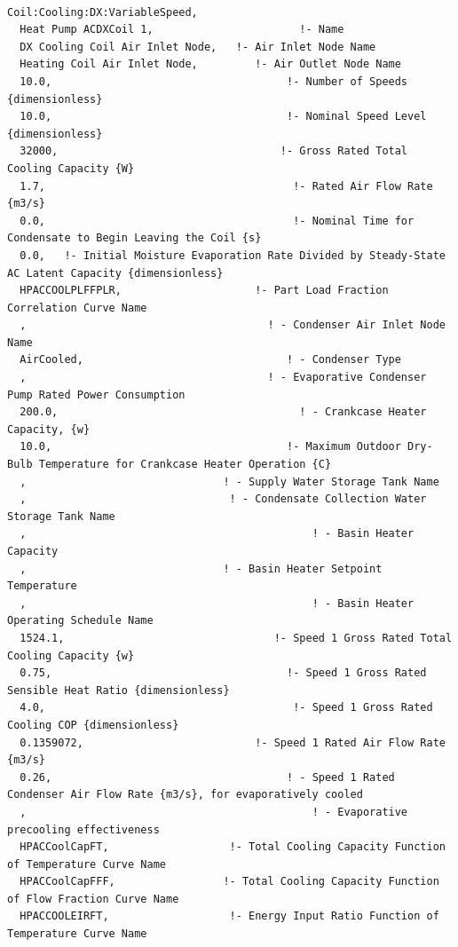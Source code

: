 \begin{lstlisting}

Coil:Cooling:DX:VariableSpeed,
  Heat Pump ACDXCoil 1,                       !- Name
  DX Cooling Coil Air Inlet Node,   !- Air Inlet Node Name
  Heating Coil Air Inlet Node,         !- Air Outlet Node Name
  10.0,                                     !- Number of Speeds {dimensionless}
  10.0,                                     !- Nominal Speed Level {dimensionless}
  32000,                                   !- Gross Rated Total Cooling Capacity {W}
  1.7,                                       !- Rated Air Flow Rate {m3/s}
  0.0,                                       !- Nominal Time for Condensate to Begin Leaving the Coil {s}
  0.0,   !- Initial Moisture Evaporation Rate Divided by Steady-State AC Latent Capacity {dimensionless}
  HPACCOOLPLFFPLR,                     !- Part Load Fraction Correlation Curve Name
  ,                                      ! - Condenser Air Inlet Node Name
  AirCooled,                                ! - Condenser Type
  ,                                      ! - Evaporative Condenser Pump Rated Power Consumption
  200.0,                                      ! - Crankcase Heater Capacity, {w}
  10.0,                                     !- Maximum Outdoor Dry-Bulb Temperature for Crankcase Heater Operation {C}
  ,                               ! - Supply Water Storage Tank Name
  ,                                ! - Condensate Collection Water Storage Tank Name
  ,                                             ! - Basin Heater Capacity
  ,                               ! - Basin Heater Setpoint Temperature
  ,                                             ! - Basin Heater Operating Schedule Name
  1524.1,                                 !- Speed 1 Gross Rated Total Cooling Capacity {w}
  0.75,                                     !- Speed 1 Gross Rated Sensible Heat Ratio {dimensionless}
  4.0,                                       !- Speed 1 Gross Rated Cooling COP {dimensionless}
  0.1359072,                           !- Speed 1 Rated Air Flow Rate {m3/s}
  0.26,                                     ! - Speed 1 Rated Condenser Air Flow Rate {m3/s}, for evaporatively cooled
  ,                                             ! - Evaporative precooling effectiveness
  HPACCoolCapFT,                   !- Total Cooling Capacity Function of Temperature Curve Name
  HPACCoolCapFFF,                 !- Total Cooling Capacity Function of Flow Fraction Curve Name
  HPACCOOLEIRFT,                   !- Energy Input Ratio Function of Temperature Curve Name

\end{lstlisting}
